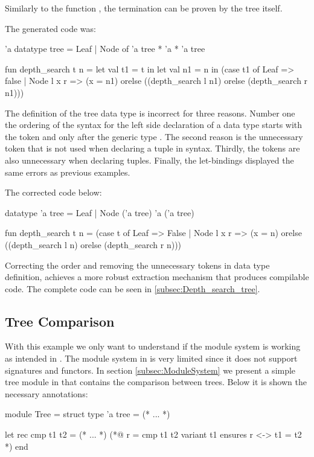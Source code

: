 Similarly to the function , the termination can be proven by the tree itself.

The generated \cml code was:

\begin{cakeml}
'a datatype tree = Leaf | Node of 'a tree * 'a * 'a tree

fun depth_search t n = let val t1 = t in
  let val n1 = n in
  (case t1 of
    Leaf => false
  | Node l x r =>
    (x = n1) orelse ((depth_search l n1) orelse (depth_search r n1)))
\end{cakeml}

The definition of the tree data type is incorrect for three reasons. Number one the ordering of the syntax for the left side declaration 
of a data type starts with the token  and only after the generic type . The second reason is the
unnecessary token  that is not used when declaring a tuple in \cml syntax. Thirdly, the tokens \inlinecode{*} are also
unnecessary when declaring tuples. Finally, the let-bindings displayed the same errors as previous examples.

The corrected code below:

\begin{cakeml}
datatype 'a tree = Leaf | Node ('a tree) 'a ('a tree)

fun depth_search t n =
  (case t of
    Leaf => False
  | Node l x r =>
    (x = n) orelse ((depth_search l n) orelse (depth_search r n)))
\end{cakeml}

Correcting the order and removing the unnecessary tokens in data type definition, achieves a more robust extraction mechanism that 
produces compilable \cml code. The complete code can be seen in \ref{subsec:Depth_search_tree}.

\subsection{Tree Comparison}

With this example we only want to understand if the module system is working as intended in \cml. The module system in \cml is very 
limited since it does not support signatures and functors. In section \ref{subsec:ModuleSystem} we present a simple tree module in \ocaml that 
contains the comparison between trees. Below it is shown the necessary \gospel annotations:

\begin{gospell}
module Tree = struct
  type 'a tree = (* ... *)

  let rec cmp t1 t2 = (* ... *)
  (*@
  r = cmp t1 t2
  variant t1
  ensures r <-> t1 = t2
  *)
end
\end{gospell}

